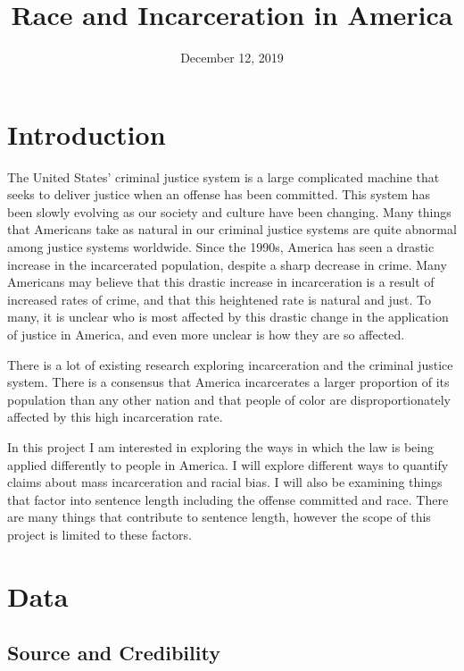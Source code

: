 \documentclass[11pt]{article}
\title{Race and Incarceration in America}
\date{December 12, 2019}
\begin{document}
    
    
    \maketitle
    
    

    

    
    \hypertarget{introduction}{%
\section{Introduction}\label{introduction}}

The United States' criminal justice system is a large complicated
machine that seeks to deliver justice when an offense has been
committed. This system has been slowly evolving as our society and
culture have been changing. Many things that Americans take as natural
in our criminal justice systems are quite abnormal among justice systems
worldwide. Since the 1990s, America has seen a drastic increase in the
incarcerated population, despite a sharp decrease in crime\cite{nyt1}.
Many Americans may believe that this drastic increase in incarceration
is a result of increased rates of crime, and that this heightened rate
is natural and just. To many, it is unclear who is most affected by this
drastic change in the application of justice in America, and even more
unclear is how they are so affected.

There is a lot of existing research exploring incarceration and the
criminal justice system. There is a consensus that America incarcerates
a larger proportion of its population than any other nation and that
people of color are disproportionately affected by this high
incarceration rate\cite{nyt2}.

In this project I am interested in exploring the ways in which the law
is being applied differently to people in America. I will explore
different ways to quantify claims about mass incarceration and racial
bias. I will also be examining things that factor into sentence length
including the offense committed and race. There are many things that
contribute to sentence length, however the scope of this project is
limited to these factors.

    \hypertarget{data}{%
\section{Data}\label{data}}

\hypertarget{source-and-credibility}{%
\subsection{Source and Credibility}\label{source-and-credibility}}
\end{document}
